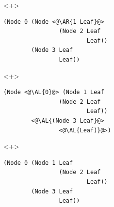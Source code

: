 \begin{frame}[fragile]
\begin{itemize}
\begin{itemize}
\begin{onlyenv}<+>
\begin{lstlisting}
(Node 0 (Node <@\AR{1 Leaf}@>
                (Node 2 Leaf
                        Leaf))
        (Node 3 Leaf
                Leaf))
\end{lstlisting}
\end{onlyenv}

\begin{onlyenv}<+>
\begin{lstlisting}
(Node <@\AL{0}@> (Node 1 Leaf
                (Node 2 Leaf
                        Leaf))
        <@\AL{(Node 3 Leaf}@>
                <@\AL{Leaf)}@>)
\end{lstlisting}
\end{onlyenv}

\begin{onlyenv}<+>
\color{gray}
\begin{lstlisting}
(Node 0 (Node 1 Leaf
                (Node 2 Leaf
                        Leaf))
        (Node 3 Leaf
                Leaf))
\end{lstlisting}
\end{onlyenv}
\end{itemize}

\end{itemize}
\end{frame}

